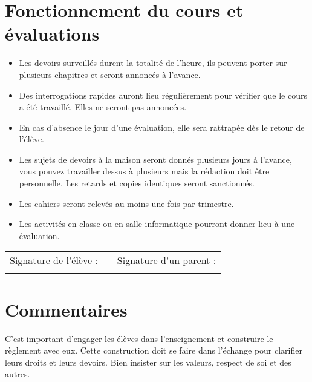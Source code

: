 \documentclass[a4paper, 11pt]{article}
\begin{document}
\section{Fonctionnement du cours et évaluations}

\begin{itemize}
	\item Les devoirs surveillés durent la totalité de l'heure, ils peuvent porter sur plusieurs chapitres et seront annoncés à l'avance.
	
	\item Des interrogations rapides auront lieu régulièrement pour vérifier que le cours a été travaillé. Elles ne seront pas annoncées.
	
	\item En cas d'absence le jour d'une évaluation, elle sera rattrapée dès le retour de l'élève.
	
	\item Les sujets de devoirs à la maison seront donnés plusieurs jours à l'avance, vous pouvez travailler dessus à plusieurs mais la rédaction doit être personnelle. Les retards et copies identiques seront sanctionnés.
	
	\item Les cahiers seront relevés au moins une fois par trimestre.
	
	\item Les activités en classe ou en salle informatique pourront donner lieu à une évaluation.
	
	
	
\end{itemize}

\vspace*{0.5cm}
\begin{tabular}{ccr}
	
	Signature de l'élève : & \hspace*{5cm} & Signature d'un parent : \\
	&  &                      
\end{tabular}
	
	
	
\section*{Commentaires}

C'est important d'engager les élèves dans l'enseignement et construire le règlement avec eux.
Cette construction doit se faire dans l'échange pour clarifier leurs droits et leurs devoirs.
Bien insister sur les valeurs, respect de soi et des autres. 
\end{document}

